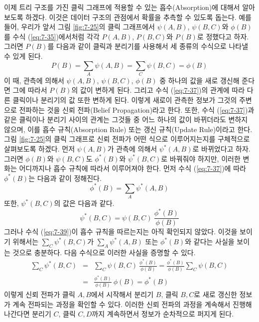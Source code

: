 \documentclass[a4paper]{oblivoir}
\begin{document}
이제 트리 구조를 가진 클릭 그래프에 적용할 수 있는 흡수(Absorption)에 대해서 알아보도록 하겠다. 이것은 데이터 구조의 관점에서 확률을 추측할 수 있도록 돕는다. 예를 들어, 우리가 앞서 그림 \ref{fig:7-25}의 클릭 그래프에서 $\psi(A,B)$, $\psi(B,C)$와 $\phi(B)$를 수식 (\ref{eq:7-35})에서처럼 각각 $P(A, B)$, $P(B, C)$와 $P(B)$로 정했다고 하자. 그러면 $P(B)$를 다음과 같이 클릭과 분리기를 사용해서 세 종류의 수식으로 나타낼 수 있게 된다.  
\begin{equation}
P(B) = \sum_{A} \psi(A,B) = \sum_{C} \psi(B,C) = \phi(B)
\label{eq:7-37}
\end{equation} 
이 때, 관측에 의해서 $\psi(A,B)$, $\psi(B,C)$, $\phi(B)$ 중 하나의 값을 새로 갱신해 준다면 그에 따라서 $P(B)$의 값이 변하게 된다. 그리고 수식 (\ref{eq:7-37})의 관계에 따라 다른 클릭이나 분리기의 값 또한 변하게 된다. 이렇게 새로이 관측한 정보가 그것의 주변으로 전파하는 것을 신뢰 전파(Belief Propagation)라고 한다. 또한, 수식 (\ref{eq:7-37})과 같은 클릭이나 분리기 사이의 관계는 그것들 중 어느 하나의 값이 바뀌더라도 변하지 않으며, 이를 흡수 규칙(Absorption Rule) 또는 갱신 규칙(Update Rule)이라고 한다.     \\

그림 \ref{fig:7-25}의 클릭 그래프로 신뢰 전파가 어떤 식으로 이루어지는지를 구체적으로 살펴보도록 하겠다. 먼저 $\psi(A,B)$가 관측에 의해서 $\psi^{*}(A,B)$로 바뀌었다고 하자. 그러면 $\phi(B)$와 $\psi(B,C)$도 $\phi^{*}(B)$와 $\psi^{*}(B,C)$로 바꿔줘야 하지만, 이러한 변화는 어디까지나 흡수 규칙에 따라서 이루어져야 한다. 먼저 수식 (\ref{eq:7-37})에 따라 $\phi^{*}(B)$는 다음과 같이 정해진다.  
\begin{equation}
\phi^{*}(B) = \sum_{A} \psi^{*}(A,B)
\label{eq:7-38}
\end{equation}
또한, $\psi^{*}(B,C)$의 값은 다음과 같다. 
\begin{equation}
\psi^{*}(B,C) = \psi(B,C) \ \frac{\phi^{*}(B)}{\phi(B)}
\label{eq:7-39}
\end{equation}
그러나 수식 (\ref{eq:7-39})이 흡수 규칙을 따르는지는 아직 확인되지 않았다. 이것을 보이기 위해서는 $\sum_{C} \psi^{*}(B,C)$가 $\sum_{A} \psi^{*}(A,B)$ 또는 $\phi^{*}(B)$와 같다는 사실을 보이는 것으로 충분하다. 다음 수식으로 이러한 사실을 증명할 수 있다.  
\begin{eqnarray}
\sum_{C} \psi^{*}(B,C) & = & \sum_{C} \psi(B,C) \ \frac{\phi^{*}(B)}{\phi(B)}  = \frac{\phi^{*}(B)}{\phi(B)} \sum_{C} \psi(B,C) \nonumber \\
& = & \frac{\phi^{*}(B)}{\phi(B)} \ \phi(B) = \phi^{*}(B) \label{eq:7-40}
\end{eqnarray}
이렇게 신뢰 전파가 클릭 $A,B$에서 시작해서 분리기 $B$, 클릭 $B,C$로 새로 갱신한 정보가 계속 전파되는 과정을 확인할 수 있다. 이러한 신뢰 전파의 과정을 계속해서 진행해 나간다면 분리기 $C$, 클릭 $C,D$까지 계속하면서 정보가 순차적으로 퍼지게 된다. \\
\end{document}

